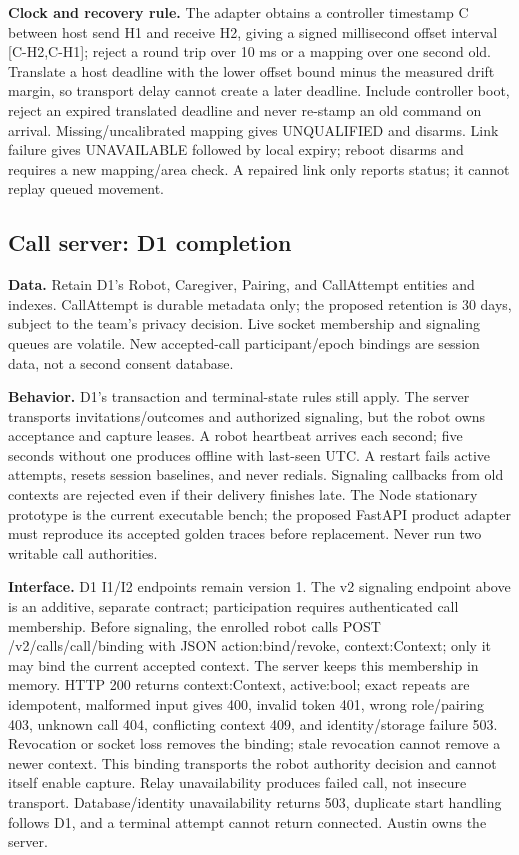 \documentclass[12pt,letterpaper]{article}
\begin{document}
\textbf{Clock and recovery rule.} The adapter obtains a controller timestamp C between host send H1 and receive H2, giving a signed millisecond offset interval [C-H2,C-H1]; reject a round trip over 10 ms or a mapping over one second old. Translate a host deadline with the lower offset bound minus the measured drift margin, so transport delay cannot create a later deadline. Include controller boot, reject an expired translated deadline and never re-stamp an old command on arrival. Missing/uncalibrated mapping gives UNQUALIFIED and disarms. Link failure gives UNAVAILABLE followed by local expiry; reboot disarms and requires a new mapping/area check. A repaired link only reports status; it cannot replay queued movement.

\subsection*{Call server: D1 completion}
\textbf{Data.} Retain D1's Robot, Caregiver, Pairing, and CallAttempt entities and indexes. CallAttempt is durable metadata only; the proposed retention is 30 days, subject to the team's privacy decision. Live socket membership and signaling queues are volatile. New accepted-call participant/epoch bindings are session data, not a second consent database.

\textbf{Behavior.} D1's transaction and terminal-state rules still apply. The server transports invitations/outcomes and authorized signaling, but the robot owns acceptance and capture leases. A robot heartbeat arrives each second; five seconds without one produces offline with last-seen UTC. A restart fails active attempts, resets session baselines, and never redials. Signaling callbacks from old contexts are rejected even if their delivery finishes late. The Node stationary prototype is the current executable bench; the proposed FastAPI product adapter must reproduce its accepted golden traces before replacement. Never run two writable call authorities.

\textbf{Interface.} D1 I1/I2 endpoints remain version 1. The v2 signaling endpoint above is an additive, separate contract; participation requires authenticated call membership. Before signaling, the enrolled robot calls POST /v2/calls/{call}/binding with JSON {action:bind/revoke, context:Context}; only it may bind the current accepted context. The server keeps this membership in memory. HTTP 200 returns {context:Context, active:bool}; exact repeats are idempotent, malformed input gives 400, invalid token 401, wrong role/pairing 403, unknown call 404, conflicting context 409, and identity/storage failure 503. Revocation or socket loss removes the binding; stale revocation cannot remove a newer context. This binding transports the robot authority decision and cannot itself enable capture. Relay unavailability produces failed call, not insecure transport. Database/identity unavailability returns 503, duplicate start handling follows D1, and a terminal attempt cannot return connected. Austin owns the server.
\end{document}
